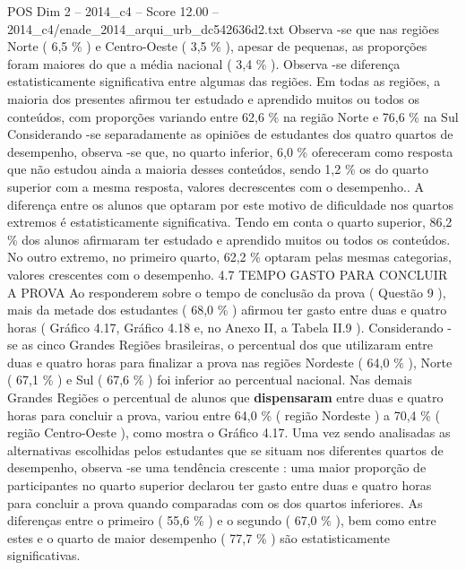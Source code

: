 \begin{textsample}{POS Dim 2 – 2014\_c4 – Score 12.00 – 2014\_c4/enade\_2014\_arqui\_urb\_dc542636d2.txt}
Observa -se que nas regiões Norte ( 6,5 \% ) e Centro-Oeste ( 3,5 \% ), apesar de pequenas, as proporções foram maiores do que a média nacional ( 3,4 \% ).
Observa -se diferença estatisticamente significativa entre algumas das regiões.
Em todas as regiões, a maioria dos presentes afirmou ter estudado e aprendido muitos ou todos os conteúdos, com proporções variando entre 62,6 \% na região Norte e 76,6 \% na Sul Considerando -se separadamente as opiniões de estudantes dos quatro quartos de desempenho, observa -se que, no quarto inferior, 6,0 \% ofereceram como resposta que não estudou ainda a maioria desses conteúdos, sendo 1,2 \% os do quarto superior com a mesma resposta, valores decrescentes com o desempenho..
A diferença entre os alunos que optaram por este motivo de dificuldade nos quartos extremos é estatisticamente significativa.
Tendo em conta o quarto superior, 86,2 \% dos alunos afirmaram ter estudado e aprendido muitos ou todos os conteúdos.
No outro extremo, no primeiro quarto, 62,2 \% optaram pelas mesmas categorias, valores crescentes com o desempenho. 4.7 TEMPO GASTO PARA CONCLUIR A PROVA Ao responderem sobre o tempo de conclusão da prova ( Questão 9 ), mais da metade dos estudantes ( 68,0 \% ) afirmou ter gasto entre duas e quatro horas ( Gráfico 4.17, Gráfico 4.18 e, no Anexo II, a Tabela II.9 ).
Considerando -se as cinco Grandes Regiões brasileiras, o percentual dos que utilizaram entre duas e quatro horas para finalizar a prova nas regiões Nordeste ( 64,0 \% ), Norte ( 67,1 \% ) e Sul ( 67,6 \% ) foi inferior ao percentual nacional.
Nas demais Grandes Regiões o percentual de alunos que \textbf{dispensaram} entre duas e quatro horas para concluir a prova, variou entre 64,0 \% ( região Nordeste ) a 70,4 \% ( região Centro-Oeste ), como mostra o Gráfico 4.17.
Uma vez sendo analisadas as alternativas escolhidas pelos estudantes que se situam nos diferentes quartos de desempenho, observa -se uma tendência crescente : uma maior proporção de participantes no quarto superior declarou ter gasto entre duas e quatro horas para concluir a prova quando comparadas com os dos quartos inferiores.
As diferenças entre o primeiro ( 55,6 \% ) e o segundo ( 67,0 \% ), bem como entre estes e o quarto de maior desempenho ( 77,7 \% ) são estatisticamente significativas.

\end{textsample}
